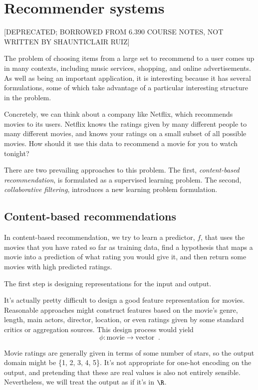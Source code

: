 \chapter{Recommender systems}
[DEPRECATED; BORROWED FROM 6.390 COURSE NOTES, NOT WRITTEN BY SHAUNTICLAIR RUIZ]

The problem of choosing items from a large set to recommend to a user
comes up in many contexts, including  music services, shopping, and online
advertisements.  As well as being an important application, it is
interesting because it has several formulations, some of which take
advantage of a particular interesting structure in the problem.  

Concretely, we can think about a company like Netflix, which
recommends movies to its users.  Netflix knows the ratings given by
many different people to many different movies, and knows your ratings on a
small subset of all possible movies. How should it use this data to 
recommend a movie for you to watch tonight?

There are two prevailing approaches to this problem.  The first,
{\em content-based recommendation}, is formulated as a supervised learning
problem.  The second, {\em collaborative filtering}, introduces a new
learning problem formulation.

\section{Content-based recommendations}
In content-based recommendation, we try to learn a predictor, $f$,
that uses the movies that you have rated so far as training data,
find a hypothesis that maps a movie into a prediction of what rating
you would give it, and then return some movies with high predicted
ratings.  

The first step is designing representations for the input and output.

It's actually pretty difficult to design a good feature representation
for movies.   Reasonable approaches might construct features based on
the movie's genre, length,  main actors, director, location, or even
ratings given by some standard critics or aggregation sources.  This
design process would yield
    \[\phi : \text{movie} \rightarrow \text{vector}\;\;.\]

Movie ratings are generally given in terms of some number of stars, 
so the output domain might be \{1, 2, 3, 4, 5\}.  It's not
appropriate for one-hot encoding on the output, and pretending that
these are real values is also not entirely sensible.  Nevertheless, we
will treat the output as if it's in $\R$.

